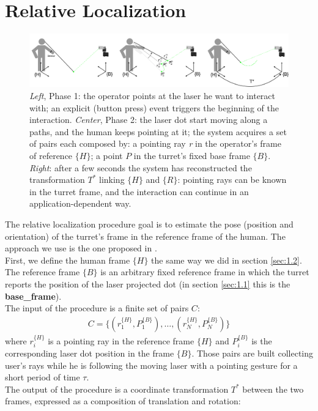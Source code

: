 \section{Relative Localization} \label{sec:relloc}
\begin{figure}
	\centering
	\includegraphics[width=\textwidth]{img/pointingRelloc.png}%
	\caption[Relloc Model]{\emph{Left}, Phase 1: the operator points at the laser he want to interact with; an explicit (button press) event triggers the beginning of the interaction. \emph{Center}, Phase 2: the laser dot start moving along a paths, and the human keeps pointing at it; the system acquires a set of pairs each composed by: a pointing ray \emph{r} in the operator’s frame of reference $\{H\}$; a point $P$ in the turret’s fixed base frame $\{B\}$. \emph{Right}: after a few seconds the system has reconstructed the transformation $T^*$ linking $\{H\}$ and $\{R\}$: pointing rays can be known in the turret frame, and the interaction can continue in an application-dependent way.}
	\label{fig:rellocExplained}
\end{figure}
The relative localization procedure goal is to estimate the pose (position and orientation) of the turret's frame in the reference frame of the human. The approach we use is the one proposed in \cite{gromov2018robot}.\\
First, we define the human frame $\{H\}$ the same way we did in section \ref{sec:1.2}. The reference frame $\{B\}$ is an arbitrary fixed reference frame in which the turret reports the position of the laser projected dot (in section \ref{sec:1.1} this is the \textbf{base\_frame}).\\ The input of the procedure is a finite set of pairs $C$:
\begin{align}
    C=\{(r_1^{\{H\}},P_1^{\{B\}}), \dots,(r_N^{\{H\}},P_N^{\{B\}})\}\nonumber
\end{align}
where $r_i^{\{H\}}$ is a pointing ray in the reference frame $\{H\}$ and $P_i^{\{B\}}$ is the corresponding laser dot position in the frame $\{B\}$. Those pairs are built collecting user's rays while he is following the moving laser with a pointing gesture for a short period of time $\tau$.\\
The output of the procedure is a coordinate transformation $T^*$ between the two frames, expressed as a composition of translation and rotation: 
